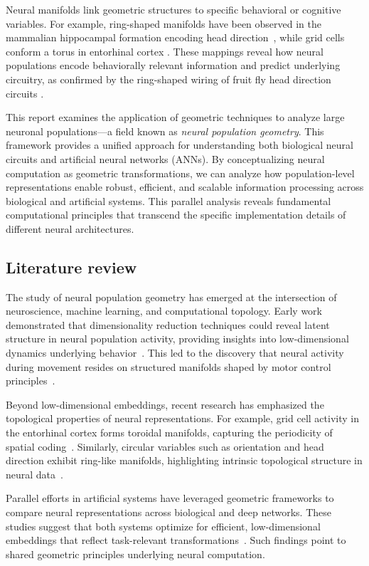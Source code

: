 \documentclass[11pt,a4paper]{article}
\begin{document}
Neural manifolds link geometric structures to specific behavioral or cognitive variables. For example, ring-shaped manifolds have been observed in the mammalian hippocampal formation encoding head direction~\cite{chaudhuri2019intrinsic}, while grid cells conform a torus in entorhinal cortex \cite{gardner2022toroidal}. These mappings reveal how neural populations encode behaviorally relevant information and predict underlying circuitry, as confirmed by the ring-shaped wiring of fruit fly head direction circuits \cite{kim2017ring}.

This report examines the application of geometric techniques to analyze large neuronal populations—a field known as \textit{neural population geometry}. This framework provides a unified approach for understanding both biological neural circuits and artificial neural networks (ANNs). By conceptualizing neural computation as geometric transformations, we can analyze how population-level representations enable robust, efficient, and scalable information processing across biological and artificial systems. This parallel analysis reveals fundamental computational principles that transcend the specific implementation details of different neural architectures.

\subsection{Literature review}

The study of neural population geometry has emerged at the intersection of neuroscience, machine learning, and computational topology. Early work demonstrated that dimensionality reduction techniques could reveal latent structure in neural population activity, providing insights into low-dimensional dynamics underlying behavior~\cite{cunningham2014dimensionality}. This led to the discovery that neural activity during movement resides on structured manifolds shaped by motor control principles~\cite{gallego2017neural}.

Beyond low-dimensional embeddings, recent research has emphasized the topological properties of neural representations. For example, grid cell activity in the entorhinal cortex forms toroidal manifolds, capturing the periodicity of spatial coding~\cite{gardner2022toroidal}. Similarly, circular variables such as orientation and head direction exhibit ring-like manifolds, highlighting intrinsic topological structure in neural data~\cite{chaudhuri2019intrinsic}.

Parallel efforts in artificial systems have leveraged geometric frameworks to compare neural representations across biological and deep networks. These studies suggest that both systems optimize for efficient, low-dimensional embeddings that reflect task-relevant transformations~\cite{chung2021neural}. Such findings point to shared geometric principles underlying neural computation.
\end{document}
